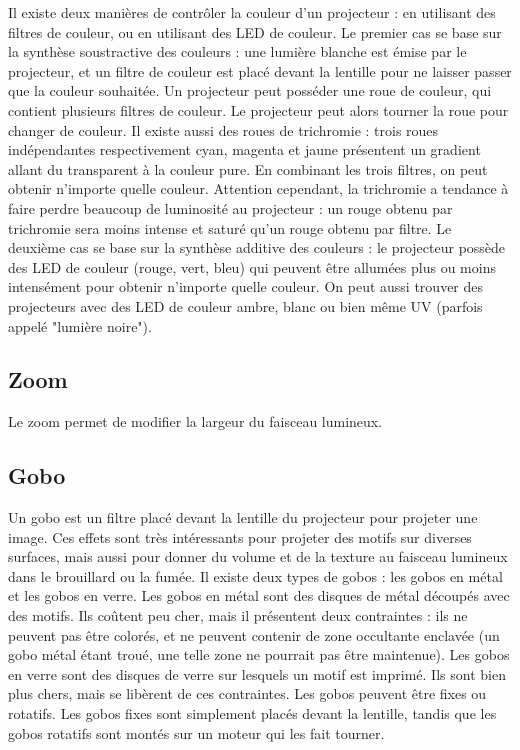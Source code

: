 Il existe deux manières de contrôler la couleur d'un projecteur : en utilisant des filtres de couleur, ou en utilisant des LED de couleur.
\newline
Le premier cas se base sur la synthèse soustractive des couleurs : une lumière blanche est émise par le projecteur, et un filtre de couleur est placé devant la lentille pour ne laisser passer que la couleur souhaitée.
Un projecteur peut posséder une roue de couleur, qui contient plusieurs filtres de couleur. Le projecteur peut alors tourner la roue pour changer de couleur.
Il existe aussi des roues de trichromie : trois roues indépendantes respectivement cyan, magenta et jaune présentent un gradient allant du transparent à la couleur pure. En combinant les trois filtres, on peut obtenir n'importe quelle couleur.
Attention cependant, la trichromie a tendance à faire perdre beaucoup de luminosité au projecteur : un rouge obtenu par trichromie sera moins intense et saturé qu'un rouge obtenu par filtre.
\newline
Le deuxième cas se base sur la synthèse additive des couleurs : le projecteur possède des LED de couleur (rouge, vert, bleu) qui peuvent être allumées plus ou moins intensément pour obtenir n'importe quelle couleur.
On peut aussi trouver des projecteurs avec des LED de couleur ambre, blanc ou bien même UV (parfois appelé "lumière noire").

\subsection{Zoom}
\label{subsec:param_zoom}

Le zoom permet de modifier la largeur du faisceau lumineux.

\subsection{Gobo}
\label{subsec:param_gobo}

Un gobo est un filtre placé devant la lentille du projecteur pour projeter une image. Ces effets sont très intéressants pour projeter des motifs sur diverses surfaces, mais aussi pour donner du volume et de la texture au faisceau lumineux dans le brouillard ou la fumée.
Il existe deux types de gobos : les gobos en métal et les gobos en verre.
\newline
Les gobos en métal sont des disques de métal découpés avec des motifs. Ils coûtent peu cher, mais il présentent deux contraintes : ils ne peuvent pas être colorés, et ne peuvent contenir de zone occultante enclavée (un gobo métal étant troué, une telle zone ne pourrait pas être maintenue).
\newline
Les gobos en verre sont des disques de verre sur lesquels un motif est imprimé. Ils sont bien plus chers, mais se libèrent de ces contraintes.
\newline
\newline
Les gobos peuvent être fixes ou rotatifs. Les gobos fixes sont simplement placés devant la lentille, tandis que les gobos rotatifs sont montés sur un moteur qui les fait tourner.

